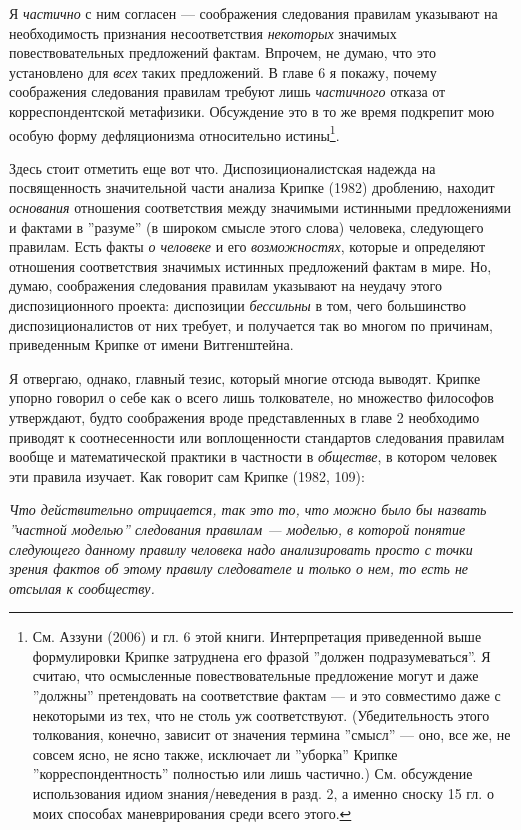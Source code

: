 \documentclass[11pt]{book}
\begin{document}
\smallskip

Я \textit{частично} с ним согласен --- соображения следования правилам указывают на необходимость признания несоответствия \textit{некоторых} значимых повествовательных предложений фактам. Впрочем, не думаю, что это установлено для \textit{всех} таких предложений. В главе 6 я покажу, почему соображения следования правилам требуют лишь \textit{частичного} отказа от корреспондентской метафизики. Обсуждение это в то же время подкрепит мою особую форму дефляционизма относительно истины\footnote{См. Аззуни (2006) и гл. 6 этой книги. Интерпретация приведенной выше формулировки Крипке затруднена его фразой ''должен подразумеваться''. Я считаю, что осмысленные повествовательные предложение могут и даже ''должны'' претендовать на соответствие фактам --- и это совместимо даже с некоторыми из тех, что не столь уж соответствуют. (Убедительность этого толкования, конечно, зависит от значения термина ''смысл'' --- оно, все же, не совсем ясно, не ясно также, исключает ли ''уборка'' Крипке ''корреспондентность'' полностью или лишь частично.) См. обсуждение использования идиом знания/неведения в разд. 2, а именно сноску 15 гл. о моих способах маневрирования среди всего этого.}.

Здесь стоит отметить еще вот что. Диспозиционалистская надежда на посвященность значительной части анализа Крипке (1982) дроблению, находит \textit{основания} отношения соответствия между значимыми истинными предложениями и фактами в ''разуме'' (в широком смысле этого слова) человека, следующего правилам. Есть факты \textit{о человеке} и его \textit{возможностях}, которые и определяют отношения соответствия значимых истинных предложений фактам в мире. Но, думаю, соображения следования правилам указывают на неудачу этого диспозиционного проекта: диспозиции \textit{бессильны} в том, чего большинство диспозиционалистов от них требует, и получается так во многом по причинам, приведенным Крипке от имени Витгенштейна.

Я отвергаю, однако, главный тезис, который многие отсюда выводят. Крипке упорно говорил о себе как о всего лишь толкователе, но множество философов утверждают, будто соображения вроде представленных в главе 2 необходимо приводят к соотнесенности или воплощенности стандартов следования правилам вообще и математической практики в частности в \textit{обществе}, в котором человек эти правила изучает. Как говорит сам Крипке (1982, 109):

\smallskip

\textit{Что действительно отрицается, так это то, что можно было бы назвать ''частной моделью'' следования правилам --- моделью, в которой понятие следующего данному правилу человека надо анализировать просто с точки зрения фактов об этому правилу следователе и только о нем, то есть не отсылая к сообществу.}
\end{document}
